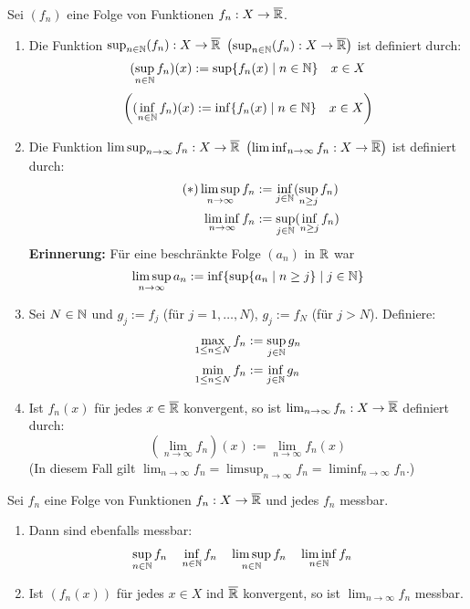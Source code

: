 \documentclass[a4paper,twoside,DIV15,BCOR12mm,chapterprefix=true,headings=onelinechapter]{scrbook}
\begin{document}
\begin{definition}
Sei $(f_n)$ eine Folge von Funktionen $f_n:X\to\overline{\mathbb{R}}$.
\begin{enumerate}
\item Die Funktion $\sup_{n\in\mathbb{N}}(f_n):X\to\overline{\mathbb{R}}$  $\left(\sup_{n\in\mathbb{N}}(f_n):X\to\overline{\mathbb{R}}\right)$ ist definiert durch:
\[(\sup_{n\in\mathbb{N}} f_n)(x):=\sup\{f_n(x)\mid n\in\mathbb{N}\}\quad x\in X\]
\[\left((\inf_{n\in\mathbb{N}} f_n)(x):=\inf\{f_n(x)\mid n\in\mathbb{N}\}\quad x\in X\right)\]
\item Die Funktion $\limsup_{n\to\infty} f_n:X\to\overline{\mathbb{R}}$ $\left(\liminf_{n\to\infty} f_n:X\to\overline{\mathbb{R}}\right)$ ist definiert durch:
\begin{align*}
\tag{$*$} \limsup_{n\to\infty} f_n &:= \inf_{j\in\mathbb{N}}(\sup_{n\ge j} f_n)\\
\liminf_{n\to\infty} f_n &:= \sup_{j\in\mathbb{N}}(\inf_{n\ge j} f_n)
\end{align*}
\textbf{Erinnerung:} Für eine beschränkte Folge $(a_n)$ in $\mathbb{R}$ war
\[\limsup_{n\to\infty} a_n:=\inf\{\sup\{a_n\mid n\ge j\}\mid j\in\mathbb{N}\}\]
\item Sei $N\in\mathbb{N}$ und $g_j:=f_j$ (für $j=1,\ldots,N$), $g_j:=f_N$ (für $j>N$). Definiere:
\begin{align*}
\max_{1\le n\le N} f_n &:=\sup_{j\in\mathbb{N}} g_n\\
\min_{1\le n\le N} f_n &:=\inf_{j\in\mathbb{N}} g_n
\end{align*}
\item Ist $f_n(x)$ für jedes $x\in\overline{\mathbb{R}}$ konvergent, so ist $\lim_{n\to\infty} f_n:X\to\overline{\mathbb{R}}$ definiert durch:
\[(\lim_{n\to\infty} f_n)(x):=\lim_{n\to\infty} f_n(x)\]
(In diesem Fall gilt $\lim_{n\to\infty} f_n = \limsup_{n\to\infty} f_n = \liminf_{n\to\infty} f_n$.)
\end{enumerate}
\end{definition}

\begin{satz}
\label{Satz 3.5}
Sei $f_n$ eine Folge von Funktionen $f_n:X\to\overline{\mathbb{R}}$ und jedes $f_n$ messbar.
\begin{enumerate}
\item Dann sind ebenfalls messbar:
\begin{align*}
&\sup_{n\in\mathbb{N}} f_n  &&\inf_{n\in\mathbb{N}} f_n &&\limsup_{n\in\mathbb{N}} f_n &&\liminf_{n\in\mathbb{N}} f_n
\end{align*}
\item Ist $(f_n(x))$ für jedes $x\in X$ ind $\overline{\mathbb{R}}$ konvergent, so ist $\lim_{n\to\infty} f_n$ messbar.
\end{enumerate}
\end{satz}
\end{document}
